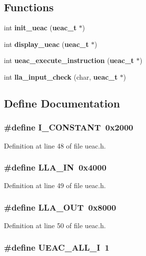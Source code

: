 \subsection*{Functions}
\begin{CompactItemize}
\item 
int {\bf init\_\-ueac} ({\bf ueac\_\-t} $\ast$)
\item 
int {\bf display\_\-ueac} ({\bf ueac\_\-t} $\ast$)
\item 
int {\bf ueac\_\-execute\_\-instruction} ({\bf ueac\_\-t} $\ast$)
\item 
int {\bf lla\_\-input\_\-check} (char, {\bf ueac\_\-t} $\ast$)
\end{CompactItemize}


\subsection{Define Documentation}
\subsubsection{\setlength{\rightskip}{0pt plus 5cm}\#define I\_\-CONSTANT~0x2000}\label{ueac_8h_a1}




Definition at line 48 of file ueac.h.
\subsubsection{\setlength{\rightskip}{0pt plus 5cm}\#define LLA\_\-IN~0x4000}\label{ueac_8h_a2}




Definition at line 49 of file ueac.h.
\subsubsection{\setlength{\rightskip}{0pt plus 5cm}\#define LLA\_\-OUT~0x8000}\label{ueac_8h_a3}




Definition at line 50 of file ueac.h.
\subsubsection{\setlength{\rightskip}{0pt plus 5cm}\#define UEAC\_\-ALL\_\-I~1}\label{ueac_8h_a9}




